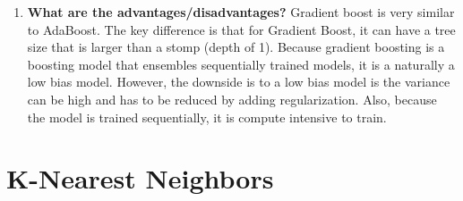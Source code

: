 \documentclass{article}
\begin{document}
\begin{enumerate}
    \item \textbf{What are the advantages/disadvantages?}
    \noindent 
    \smallbreak
    Gradient boost is very similar to AdaBoost. The key difference is that for Gradient Boost, it can have a tree size that is larger than a stomp (depth of 1). Because gradient boosting is a boosting model that ensembles sequentially trained models, it is a naturally a low bias model. However, the downside is to a low bias model is the variance can be high and has to be reduced by adding regularization. Also, because the model is trained sequentially, it is compute intensive to train.
    
\end{enumerate}


\section{K-Nearest Neighbors}
\noindent
\end{document}
